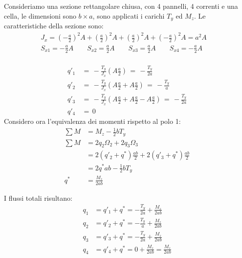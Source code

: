 \begin{esempioBox}
    Consideriamo una sezione rettangolare chiusa, con 4 pannelli, 4 correnti e una cella, le dimensioni sono $b\times a$, sono applicati i carichi $T_y$ ed $M_z$. Le caratteristiche della sezione sono:
    \begin{align*}
        J_x = \left(-\frac{a}{2}\right)^2A +\left(\frac{a}{2}\right)^2A+ \left(\frac{a}{2}\right)^2A +\left(-\frac{a}{2}\right)^2A = a^2A\quad\\
        S_{x1} = -\frac{a}{2}A\quad\quad S_{x2} = \frac{a}{2}A\quad\quad S_{x3} = \frac{a}{2}A\quad\quad S_{x4} = -\frac{a}{2}A\\
    \end{align*}

    \begin{align*}
         q'_1 \,&= \,  -\frac{T_y}{J_x}\left( A\frac{a}{2} \right) \,=\, -\frac{T_y}{2a}\\
          q'_2 \,&= \, -\frac{T_y}{J_x}\left( A\frac{a}{2}+A\frac{a}{2} \right) \,=\, -\frac{T_y}{a}\\
           q'_3 \,&= \,  -\frac{T_y}{J_x}\left( A\frac{a}{2}+A\frac{a}{2}-A\frac{a}{2} \right) \,=\, -\frac{T_y}{2a}\\
            q'_4 \,&= \, 0
    \end{align*}
    Considero ora l'equivalenza dei momenti rispetto al polo 1:
        \begin{align*}
            \sum M &= M_z-\frac{1}{2}bT_y\\
            \sum M &= 2q_2\Omega_2+ 2q_3\Omega_3\\
            &=2(q'_2+q^*)\frac{ab}{2}+2(q'_3+q^*)\frac{ab}{2}\\
            &=2q^*ab-\frac{1}{2}bT_y\\
            q^*&=   \frac{M_z}{2ab}
        \end{align*}

        I flussi totali risultano:
    \begin{align*}
        q_1 &= q'_1 + q^* = -\frac{T_y}{2a} + \frac{M_z}{2ab}\\
        q_2 &= q'_2 + q^* = -\frac{T_y}{a} + \frac{M_z}{2ab}\\
        q_3 &= q'_3 + q^* = -\frac{T_y}{2a} + \frac{M_z}{2ab}\\
        q_4 &= q'_4 + q^* = 0 + \frac{M_z}{2ab} = \frac{M_z}{2ab}
    \end{align*}
\end{esempioBox}


